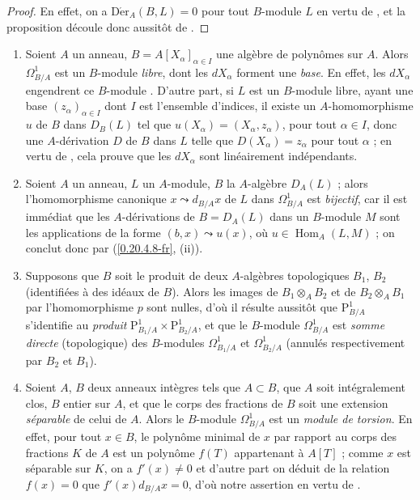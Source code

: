 \begin{proof}
En effet, on a $\operatorname{D\acute{e}r}_A(B,L)=0$ pour tout $B$-module
$L$ en vertu de , et la proposition découle donc aussitôt
de .
\end{proof}

\begin{examples}[20.4.13]
\label{0.20.4.13-fr}
\begin{enumerate}
  \item[\rm(i)] Soient $A$ un anneau,
  $B=A[X_\alpha]_{\alpha\in I}$ une algèbre de polynômes sur $A$. Alors
  $\Omega^1_{B/A}$ est un $B$-module \emph{libre}, dont les $dX_\alpha$ forment une
  \emph{base}. En effet, les $dX_\alpha$ engendrent ce $B$-module
  . D'autre part, si $L$ est un $B$-module libre, ayant
  une base $(z_\alpha)_{\alpha\in I}$ dont $I$ est l'ensemble d'indices, il
  existe un $A$-homomorphisme $u$ de $B$ dans $D_B(L)$ tel que
  $u(X_\alpha)=(X_\alpha,z_\alpha)$, pour tout $\alpha\in I$, donc
   une $A$-dérivation $D$ de $B$ dans $L$ telle que
  $D(X_\alpha)=z_\alpha$ pour tout $\alpha$ ; en vertu de
  , cela prouve que les $dX_\alpha$ sont linéairement
  indépendants.
  \item[\rm(ii)] Soient $A$ un anneau, $L$ un $A$-module, $B$ la
  $A$-algèbre $D_A(L)$ ; alors l'homomorphisme canonique
  $x\leadsto d_{B/A}x$ de $L$ dans $\Omega^1_{B/A}$ est \emph{bijectif}, car
  il est immédiat que les $A$-dérivations de $B=D_A(L)$ dans un $B$-module
  $M$ sont les applications de la forme $(b,x)\leadsto u(x)$, où
  $u\in\operatorname{Hom}_A(L,M)$ ; on conclut donc par
  (\ref{0.20.4.8-fr}, (ii)).
  \item[\rm(iii)] Supposons que $B$ soit le produit de deux $A$-algèbres
  topologiques $B_1$, $B_2$ (identifiées à des idéaux de $B$). Alors les
  images de $B_1\otimes_A B_2$ et de $B_2\otimes_A B_1$ par l'homomorphisme
  $p$  sont nulles, d'où il résulte aussitôt que
  $\mathrm{P}^1_{B/A}$ s'identifie au \emph{produit}
  $\mathrm{P}^1_{B_1/A}\times\mathrm{P}^1_{B_2/A}$, et que le $B$-module
  $\Omega^1_{B/A}$ est \emph{somme directe} (topologique) des $B$-modules
  $\Omega^1_{B_1/A}$ et $\Omega^1_{B_2/A}$ (annulés respectivement par
  $B_2$ et $B_1$).
  \item[\rm(iv)] Soient $A$, $B$ deux anneaux intègres tels que $A\subset
  B$, que $A$ soit intégralement clos, $B$ entier sur $A$, et que le corps
  des fractions de $B$ soit une extension \emph{séparable} de celui de $A$. Alors
  le $B$-module $\Omega^1_{B/A}$ est un \emph{module de torsion}. En effet,
  pour tout $x\in B$, le polynôme minimal de $x$ par rapport au corps des
  fractions $K$ de $A$ est un polynôme $f(T)$ appartenant à $A[T]$ ; comme
  $x$ est séparable sur $K$, on a $f'(x)\neq0$ et d'autre part on déduit de
  la relation $f(x)=0$ que $f'(x)d_{B/A}x=0$, d'où notre assertion en vertu
  de .
\end{enumerate}
\end{examples}

